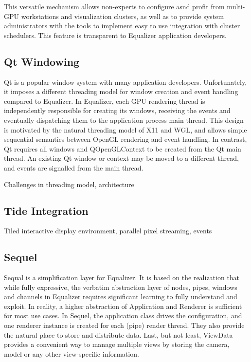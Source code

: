 \documentclass[10pt,journal,compsoc]{IEEEtran}
\begin{document}
This versatile mechanism allows non-experts to configure asnd profit from
multi-GPU workstations and visualization clusters, as well as to provide system
administrators with the tools to implement easy to use integration with cluster
schedulers. This feature is transparent to Equalizer application developers.

\subsection{Qt Windowing}

Qt is a popular window system with many application developers. Unfortunately,
it imposes a different threading model for window creation and event handling
compared to Equalizer. In Equalizer, each GPU rendering thread is independently
responsible for creating its windows, receiving the events and eventually
dispatching them to the application process main thread. This design is
motivated by the natural threading model of X11 and WGL, and allows simple
sequential semantics between OpenGL rendering and event handling. In contrast,
Qt requires all windows and QOpenGLContext to be created from the Qt main
thread. An existing Qt window or context may be moved to a different thread, and
events are signalled from the main thread.

Challenges in threading model, architecture

\subsection{Tide Integration}

Tiled interactive display environment, parallel pixel streaming, events

\subsection{Sequel}\label{sec:sequel}

Sequal is a simplification layer for Equalizer. It is based on the realization
that while fully expressive, the verbatim abstraction layer of nodes, pipes,
windows and channels in Equalizer requires significant learning to fully
understand and exploit. In reality, a higher abstraction of \textsf{Application}
and \textsf{Renderer} is sufficient for most use cases. In Sequel, the
application class drives the configuration, and one renderer instance is created
for each (pipe) render thread. They also provide the natural place to store and
distribute data. Last, but not least, \textsf{ViewData} provides a convenient
way to manage multiple views by storing the camera, model or any other
view-specific information.
\end{document}
